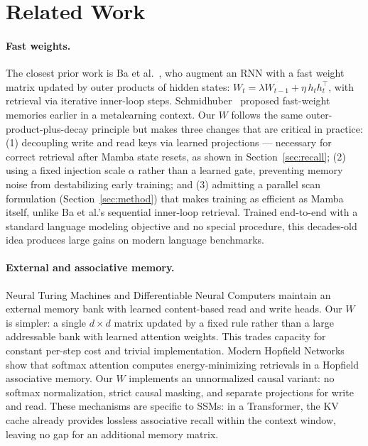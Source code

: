 \documentclass{article}
\begin{document}
\clearpage
\section{Related Work}

\paragraph{Fast weights.}
The closest prior work is Ba et al.~\citep{ba2016using}, who augment an RNN with a fast weight matrix updated by outer products of hidden states: $W_t = \lambda W_{t-1} + \eta\, h_t h_t^\top$, with retrieval via iterative inner-loop steps. Schmidhuber~\citep{schmidhuber1992learning} proposed fast-weight memories earlier in a metalearning context. Our $W$ follows the same outer-product-plus-decay principle but makes three changes that are critical in practice: (1) decoupling write and read keys via learned projections --- necessary for correct retrieval after Mamba state resets, as shown in Section~\ref{sec:recall}; (2) using a fixed injection scale $\alpha$ rather than a learned gate, preventing memory noise from destabilizing early training; and (3) admitting a parallel scan formulation (Section~\ref{sec:method}) that makes training as efficient as Mamba itself, unlike Ba et al.'s sequential inner-loop retrieval. Trained end-to-end with a standard language modeling objective and no special procedure, this decades-old idea produces large gains on modern language benchmarks.

\paragraph{External and associative memory.}
Neural Turing Machines \citep{graves2014neural} and Differentiable Neural Computers \citep{graves2016hybrid} maintain an external memory bank with learned content-based read and write heads. Our $W$ is simpler: a single $d \times d$ matrix updated by a fixed rule rather than a large addressable bank with learned attention weights. This trades capacity for constant per-step cost and trivial implementation. Modern Hopfield Networks \citep{ramsauer2021hopfield} show that softmax attention computes energy-minimizing retrievals in a Hopfield associative memory. Our $W$ implements an unnormalized causal variant: no softmax normalization, strict causal masking, and separate projections for write and read. These mechanisms are specific to SSMs: in a Transformer, the KV cache already provides lossless associative recall within the context window, leaving no gap for an additional memory matrix.
\end{document}
